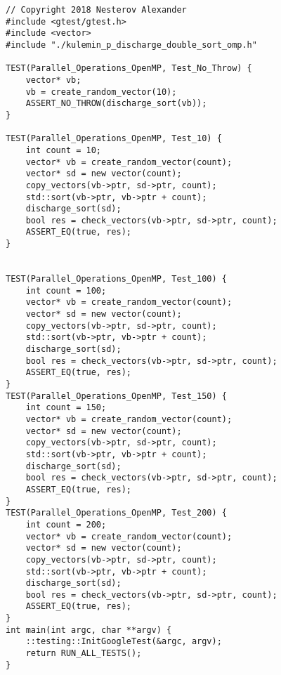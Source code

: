 \documentclass{report}
\begin{document}
\begin{lstlisting}
// Copyright 2018 Nesterov Alexander
#include <gtest/gtest.h>
#include <vector>
#include "./kulemin_p_discharge_double_sort_omp.h"

TEST(Parallel_Operations_OpenMP, Test_No_Throw) {
    vector* vb;
    vb = create_random_vector(10);
    ASSERT_NO_THROW(discharge_sort(vb));
}

TEST(Parallel_Operations_OpenMP, Test_10) {
    int count = 10;
    vector* vb = create_random_vector(count);
    vector* sd = new vector(count);
    copy_vectors(vb->ptr, sd->ptr, count);
    std::sort(vb->ptr, vb->ptr + count);
    discharge_sort(sd);
    bool res = check_vectors(vb->ptr, sd->ptr, count);
    ASSERT_EQ(true, res);
}


TEST(Parallel_Operations_OpenMP, Test_100) {
    int count = 100;
    vector* vb = create_random_vector(count);
    vector* sd = new vector(count);
    copy_vectors(vb->ptr, sd->ptr, count);
    std::sort(vb->ptr, vb->ptr + count);
    discharge_sort(sd);
    bool res = check_vectors(vb->ptr, sd->ptr, count);
    ASSERT_EQ(true, res);
}
TEST(Parallel_Operations_OpenMP, Test_150) {
    int count = 150;
    vector* vb = create_random_vector(count);
    vector* sd = new vector(count);
    copy_vectors(vb->ptr, sd->ptr, count);
    std::sort(vb->ptr, vb->ptr + count);
    discharge_sort(sd);
    bool res = check_vectors(vb->ptr, sd->ptr, count);
    ASSERT_EQ(true, res);
}
TEST(Parallel_Operations_OpenMP, Test_200) {
    int count = 200;
    vector* vb = create_random_vector(count);
    vector* sd = new vector(count);
    copy_vectors(vb->ptr, sd->ptr, count);
    std::sort(vb->ptr, vb->ptr + count);
    discharge_sort(sd);
    bool res = check_vectors(vb->ptr, sd->ptr, count);
    ASSERT_EQ(true, res);
}
int main(int argc, char **argv) {
    ::testing::InitGoogleTest(&argc, argv);
    return RUN_ALL_TESTS();
}

\end{lstlisting}
\end{document}
